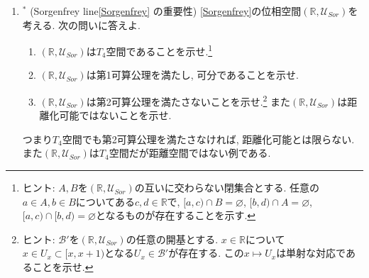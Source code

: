 \documentclass[dvipdfmx,a4paper,11pt]{article}
\newcommand{\R}{\mathbb{R}}
\theoremstyle{definition}
\begin{document}
\begin{enumerate}[label=\textbf{問}\ref*{sec-countable}.\arabic*]
	\setlength{\parskip}{0cm} 
  \setlength{\itemsep}{7pt} 

\item$^{*}$  \label{Sor1}(Sorgenfrey line\ref{Sorgenfrey} の重要性) \ref{Sorgenfrey}の位相空間$(\R,\mathscr{U}_{Sor})$を考える. 
次の問いに答えよ. 
	 \begin{enumerate}
	 	\setlength{\parskip}{0cm} 
  \setlength{\itemsep}{0pt} 
  	\item $(\R,\mathscr{U}_{Sor})$は$T_4$空間であることを示せ.\footnote{ヒント: $A,B$を$(\R,\mathscr{U}_{Sor})$の互いに交わらない閉集合とする. 任意の$a \in A, b \in B$についてある$c,d \in \R$で, $[a, c) \cap B = \varnothing$, $[b, d) \cap A = \varnothing$, $[a, c) \cap [b, d) = \varnothing $となるものが存在することを示す.}
	\item $(\R,\mathscr{U}_{Sor})$は第1可算公理を満たし, 可分であることを示せ.
	\item $(\R,\mathscr{U}_{Sor})$は第2可算公理を満たさないことを示せ.\footnote{ヒント: $\mathscr{B}'$を$(\R,\mathscr{U}_{Sor})$の任意の開基とする. $x \in \R$について$x \in U_x \subset [x, x+1)$となる$U_x \in \mathscr{B}'$が存在する. この$x \mapsto U_x$は単射な対応であることを示せ. } また$(\R,\mathscr{U}_{Sor})$は距離化可能ではないことを示せ. 
\end{enumerate}
つまり$T_4$空間でも第2可算公理を満たさなければ, 距離化可能とは限らない. また$(\R,\mathscr{U}_{Sor})$は$T_4$空間だが距離空間ではない例である.


\end{enumerate}
\end{document}

